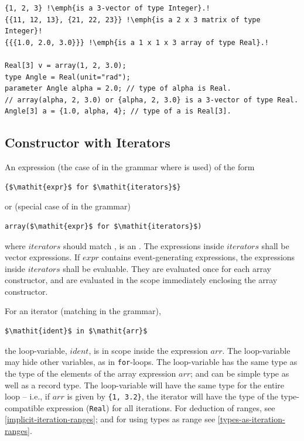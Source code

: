 \begin{example}
\begin{lstlisting}[language=modelica, escapechar=!]
{1, 2, 3} !\emph{is a 3-vector of type Integer}.!
{{11, 12, 13}, {21, 22, 23}} !\emph{is a 2 x 3 matrix of type Integer}!
{{{1.0, 2.0, 3.0}}} !\emph{is a 1 x 1 x 3 array of type Real}.!

Real[3] v = array(1, 2, 3.0);
type Angle = Real(unit="rad");
parameter Angle alpha = 2.0; // type of alpha is Real.
// array(alpha, 2, 3.0) or {alpha, 2, 3.0} is a 3-vector of type Real.
Angle[3] a = {1.0, alpha, 4}; // type of a is Real[3].
\end{lstlisting}
\end{example}

\subsection{Constructor with Iterators}\label{array-constructor-with-iterators}\label{constructor-with-iterators}

An expression (the case of  in the grammar where  is used) of the form
\begin{lstlisting}[language=modelica]
{$\mathit{expr}$ for $\mathit{iterators}$}
\end{lstlisting}
or (special case of  in the grammar)
\begin{lstlisting}[language=modelica]
array($\mathit{expr}$ for $\mathit{iterators}$)
\end{lstlisting}
where $\mathit{iterators}$ should match , is an .
The expressions inside $\mathit{iterators}$ shall be vector expressions.
If $\mathit{expr}$ contains event-generating expressions, the expressions inside $\mathit{iterators}$ shall be evaluable.
They are evaluated once for each array constructor, and are evaluated in the scope immediately enclosing the array constructor.

For an iterator (matching  in the grammar),
\begin{lstlisting}[language=modelica]
$\mathit{ident}$ in $\mathit{arr}$
\end{lstlisting}
the loop-variable, $\mathit{ident}$, is in scope inside the expression $\mathit{arr}$.
The loop-variable may hide other variables, as in \lstinline!for!-loops.
The loop-variable has the same type as the type of the elements of the array expression $\mathit{arr}$; and can be simple type as well as a record type.
The loop-variable will have the same type for the entire loop -- i.e., if $\mathit{arr}$ is given by \lstinline!{1, 3.2}!, the iterator will have the type of the type-compatible expression (\lstinline!Real!) for all iterations.
For deduction of ranges, see
\cref{implicit-iteration-ranges}; and for using types as range see \cref{types-as-iteration-ranges}.

